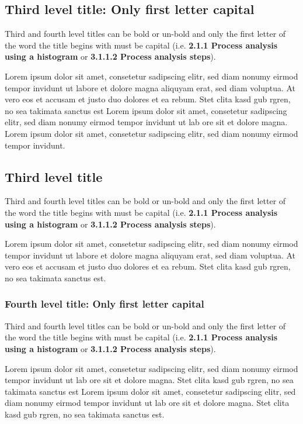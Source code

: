 \subsection{Third level title: Only first letter capital}

Third and fourth level titles can be bold or un-bold and only the first letter of the word the title begins with must be capital (i.e. \textbf{2.1.1 Process analysis using a histogram} or \textbf{3.1.1.2 Process analysis steps}).

Lorem ipsum dolor sit amet, consetetur sadipscing elitr, sed diam nonumy eirmod tempor invidunt ut labore et dolore magna aliquyam erat, sed diam voluptua. At vero eos et accusam et justo duo dolores et ea rebum. Stet clita kasd gub rgren, no sea takimata sanctus est Lorem ipsum dolor sit amet, consetetur sadipscing elitr, sed diam nonumy eirmod tempor invidunt ut lab ore sit et dolore magna. Lorem ipsum dolor sit amet, consetetur sadipscing elitr, sed diam nonumy eirmod tempor invidunt.

\subsection{Third level title}

Third and fourth level titles can be bold or un-bold and only the first letter of the word the title begins with must be capital (i.e. \textbf{2.1.1 Process analysis using a histogram} or \textbf{3.1.1.2 Process analysis steps}).

Lorem ipsum dolor sit amet, consetetur sadipscing elitr, sed diam nonumy eirmod tempor invidunt ut labore et dolore magna aliquyam erat, sed diam voluptua. At vero eos et accusam et justo duo dolores et ea rebum. Stet clita kasd gub rgren, no sea takimata sanctus est.

\subsubsection{Fourth level title: Only first letter capital}

Third and fourth level titles can be bold or un-bold and only the first letter of the word the title begins with must be capital (i.e. \textbf{2.1.1 Process analysis using a histogram} or \textbf{3.1.1.2 Process analysis steps}).

Lorem ipsum dolor sit amet, consetetur sadipscing elitr, sed diam nonumy eirmod tempor invidunt ut lab ore sit et dolore magna. Stet clita kasd gub rgren, no sea takimata sanctus est Lorem ipsum dolor sit amet, consetetur sadipscing elitr, sed diam nonumy eirmod tempor invidunt ut lab ore sit et dolore magna. Stet clita kasd gub rgren, no sea takimata sanctus est.

